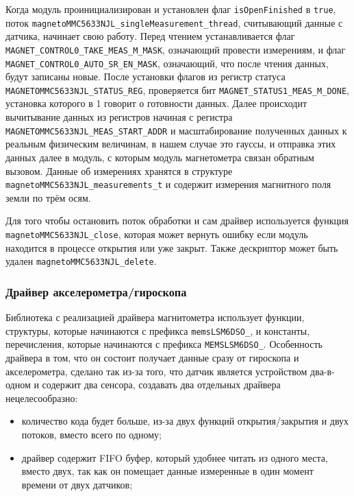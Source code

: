 Когда модуль проинициализирован и установлен флаг \lstinline{isOpenFinished} в \lstinline{true}, поток \lstinline{magnetoMMC5633NJL_singleMeasurement_thread},
считывающий данные с датчика, начинает свою работу. Перед чтением устанавливается флаг \lstinline{MAGNET_CONTROL0_TAKE_MEAS_M_MASK}, означающий провести измерениям,
и флаг \lstinline{MAGNET_CONTROL0_AUTO_SR_EN_MASK}, означающий, что после чтения данных, будут записаны новые. После установки флагов
из регистр статуса \lstinline{MAGNETOMMC5633NJL_STATUS_REG}, проверяется бит \lstinline{MAGNET_STATUS1_MEAS_M_DONE}, установка которого в 1 говорит о
готовности данных. Далее происходит вычитывание данных из регистров начиная с регистра \lstinline{MAGNETOMMC5633NJL_MEAS_START_ADDR} и масштабирование полученных данных
к реальным физическим величинам, в нашем случае это гауссы, и отправка этих данных далее в модуль, с которым модуль магнетометра связан обратным вызовом.
Данные об измерениях хранятся в структуре \lstinline{magnetoMMC5633NJL_measurements_t} и содержит измерения магнитного поля земли по трём осям.

Для того чтобы остановить поток обработки и сам драйвер используется функция \lstinline{magnetoMMC5633NJL_close}, которая может вернуть ошибку если модуль находится в процессе открытия
или уже закрыт. Также дескриптор может быть удален \lstinline{magnetoMMC5633NJL_delete}.

\subsubsection{Драйвер акселерометра/гироскопа}
Библиотека с реализацией драйвера магнитометра использует функции, структуры,
которые начинаются с префикса \lstinline{memsLSM6DSO_}, и константы, перечисления, которые начинаются с префикса \lstinline{MEMSLSM6DSO_}.
Особенность драйвера в том, что он состоит получает данные сразу от гироскопа и акселерометра, сделано так из-за
того, что датчик является устройством два-в-одном и содержит два сенсора, создавать два отдельных драйвера нецелесообразно:
\begin{itemize}
    \item количество кода будет больше, из-за двух функций открытия/закрытия и двух потоков, вместо всего по одному;
    \item драйвер содержит FIFO буфер, который удобнее читать из одного места, вместо двух, так как он помещает данные
    измеренные в один момент времени от двух датчиков;
\end{itemize}

